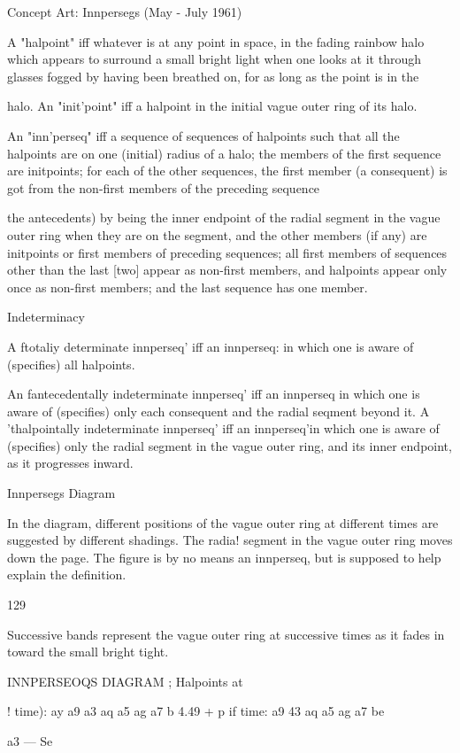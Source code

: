 \documentclass[10pt,twoside]{memoir}
\begin{document}
\begin{enumerate}
{{{{{{{{{{{{{{{{Concept Art: Innpersegs (May - July 1961) 

A "halpoint" iff whatever is at any point in space, in the fading rainbow halo 
which appears to surround a small bright light when one looks at it through 
glasses fogged by having been breathed on, for as long as the point is in the 


halo. 
An "init'point" iff a halpoint in the initial vague outer ring of its halo. 


An "inn'perseq" iff a sequence of sequences of halpoints such that all the 
halpoints are on one (initial) radius of a halo; the members of the first 
sequence are initpoints; for each of the other sequences, the first member (a 
consequent) is got from the non-first members of the preceding sequence 
{the antecedents) by being the inner endpoint of the radial segment in the 
vague outer ring when they are on the segment, and the other members (if 
any) are initpoints or first members of preceding sequences; all first members 
of sequences other than the last [two] appear as non-first members, and 
halpoints appear only once as non-first members; and the last sequence has 
one member. 


Indeterminacy 

A ftotaliy determinate innperseq' iff an innperseq: in which one is aware of 
(specifies) all halpoints. 

An fantecedentally indeterminate innperseq' iff an innperseq in which one is 
aware of (specifies) only each consequent and the radial seqment beyond it. 
A 'thalpointally indeterminate innperseq' iff an innperseq'in which one is 
aware of (specifies) only the radial segment in the vague outer ring, and its 
inner endpoint, as it progresses inward. 

Innpersegs Diagram 

In the diagram, different positions of the vague outer ring at different times 
are suggested by different shadings. The radia! segment in the vague outer 
ring moves down the page. The figure is by no means an innperseq, but is 
supposed to help explain the definition. 


129 


Successive bands represent the vague outer ring at successive times as it fades in toward the small bright tight. 


INNPERSEOQS DIAGRAM ; 
Halpoints at 


! time): ay a9 a3 aq a5 ag a7 b 
4.49 + p 
if time: a9 43 aq a5 ag a7 be 


a3 — Se 


}}}}}}}}}}}}}}}}}
\end{enumerate}
\end{document}
